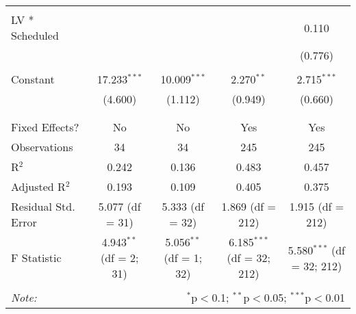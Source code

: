 \begin{table}[!htbp]
\begin{tabular}{@{\extracolsep{5pt}}lcccc}
  & & & & \\
 LV * Scheduled &  &  &  & 0.110 \\
  &  &  &  & (0.776) \\
  & & & & \\
 Constant & 17.233$^{***}$ & 10.009$^{***}$ & 2.270$^{**}$ & 2.715$^{***}$ \\
  & (4.600) & (1.112) & (0.949) & (0.660) \\
  & & & & \\
\hline \\[-1.8ex]
Fixed Effects? & No & No & Yes & Yes \\
Observations & 34 & 34 & 245 & 245 \\
R$^{2}$ & 0.242 & 0.136 & 0.483 & 0.457 \\
Adjusted R$^{2}$ & 0.193 & 0.109 & 0.405 & 0.375 \\
Residual Std. Error & 5.077 (df = 31) & 5.333 (df = 32) & 1.869 (df = 212) & 1.915 (df = 212) \\
F Statistic & 4.943$^{**}$ (df = 2; 31) & 5.056$^{**}$ (df = 1; 32) & 6.185$^{***}$ (df = 32; 212) & 5.580$^{***}$ (df = 32; 212) \\
\hline
\hline \\[-1.8ex]
\textit{Note:}  & \multicolumn{4}{r}{$^{*}$p$<$0.1; $^{**}$p$<$0.05; $^{***}$p$<$0.01} \\
\end{tabular}
\end{table}
